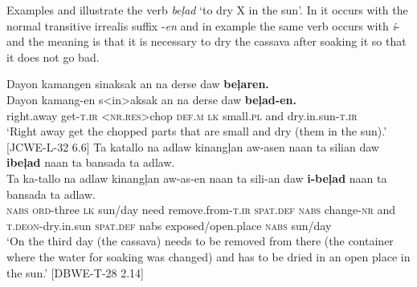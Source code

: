 Examples  and  illustrate the verb \textit{beļad} ‘to dry X in the sun’. In  it occurs with the normal transitive irrealis suffix -\textit{en} and in example  the same verb occurs with \textit{i}{}- and the meaning is that it is necessary to dry the cassava after soaking it so that it does not go bad.

\ea
\label{bkm:Ref447002651}
Dayon  kamangen  sinaksak  an  na  derse  daw  \textbf{beļaren.} \\\smallskip
 \gll Dayon  kamang-en  s<in>aksak  an  na  derse  daw  \textbf{beļad-en.} \\
right.away  get-\textsc{t.ir}  <\textsc{nr.res}>chop  \textsc{def.m}  \textsc{lk}  small.\textsc{pl}  and  dry.in.sun-\textsc{t.ir} \\
\glt ‘Right away get the chopped parts that are small and dry (them in the sun).’ [JCWE-L-32 6.6]
\z
\ea
\label{bkm:Ref119941331}
Ta  katallo  na  adlaw  kinangļan  aw-asen  naan  ta silian  daw  \textbf{ibeļad}  naan  ta  bansada ta  adlaw. \\\smallskip
 \gll Ta  ka-tallo  na  adlaw  kinangļan  aw-as-en  naan  ta sili-an  daw  \textbf{i-beļad}  naan  ta  bansada ta  adlaw. \\
\textsc{nabs}  \textsc{ord}-three  \textsc{lk} sun/day  need  remove.from-\textsc{t.ir}  \textsc{spat.def}  \textsc{nabs}
change-\textsc{nr} and \textsc{t.deon}-dry.in.sun \textsc{spat.def}  {nabs}  exposed/open.place
\textsc{nabs} sun/day \\
\glt `On the third day (the cassava) needs to be removed from there (the container where the water for soaking was changed) and has to be dried in an open place in the sun.’ [DBWE-T-28 2.14]
\z

